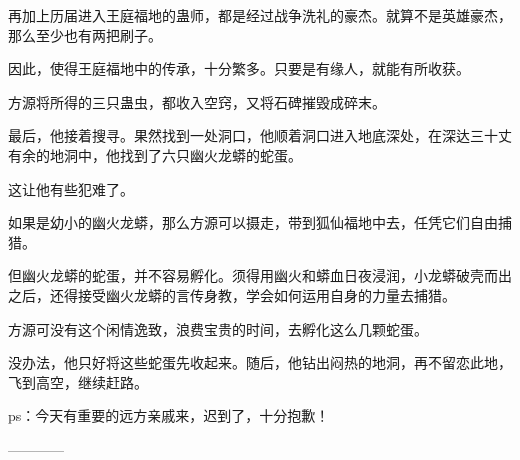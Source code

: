 \begin{this_body}
再加上历届进入王庭福地的蛊师，都是经过战争洗礼的豪杰。就算不是英雄豪杰，那么至少也有两把刷子。

因此，使得王庭福地中的传承，十分繁多。只要是有缘人，就能有所收获。

方源将所得的三只蛊虫，都收入空窍，又将石碑摧毁成碎末。

最后，他接着搜寻。果然找到一处洞口，他顺着洞口进入地底深处，在深达三十丈有余的地洞中，他找到了六只幽火龙蟒的蛇蛋。

这让他有些犯难了。

如果是幼小的幽火龙蟒，那么方源可以摄走，带到狐仙福地中去，任凭它们自由捕猎。

但幽火龙蟒的蛇蛋，并不容易孵化。须得用幽火和蟒血日夜浸润，小龙蟒破壳而出之后，还得接受幽火龙蟒的言传身教，学会如何运用自身的力量去捕猎。

方源可没有这个闲情逸致，浪费宝贵的时间，去孵化这么几颗蛇蛋。

没办法，他只好将这些蛇蛋先收起来。随后，他钻出闷热的地洞，再不留恋此地，飞到高空，继续赶路。

ps：今天有重要的远方亲戚来，迟到了，十分抱歉！

------------

\end{this_body}

